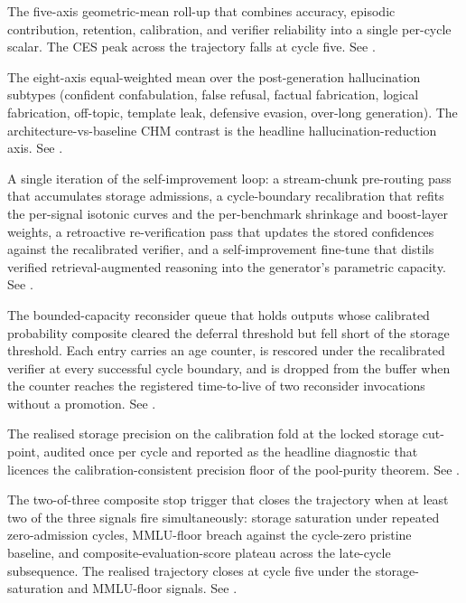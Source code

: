 \begin{description}[style=nextline, leftmargin=0pt, labelindent=0pt, itemsep=6pt, parsep=0pt, font=\bfseries, beginpenalty=10000]
\item[Composite evaluation score (CES).] The five-axis geometric-mean roll-up that combines accuracy, episodic contribution, retention, calibration, and verifier reliability into a single per-cycle scalar. The CES peak across the trajectory falls at cycle five. See .

\item[Composite hallucination metric (CHM).]\nopagebreak[4] The eight-axis equal-weighted mean over the post-generation hallucination subtypes (confident confabulation, false refusal, factual fabrication, logical fabrication, off-topic, template leak, defensive evasion, over-long generation). The architecture-vs-baseline CHM contrast is the headline hallucination-reduction axis. See .

\item[Cycle.]\nopagebreak[4] A single iteration of the self-improvement loop: a stream-chunk pre-routing pass that accumulates storage admissions, a cycle-boundary recalibration that refits the per-signal isotonic curves and the per-benchmark shrinkage and boost-layer weights, a retroactive re-verification pass that updates the stored confidences against the recalibrated verifier, and a self-improvement fine-tune that distils verified retrieval-augmented reasoning into the generator's parametric capacity. See .

\item[Deferred buffer.] The bounded-capacity reconsider queue that holds outputs whose calibrated probability composite cleared the deferral threshold but fell short of the storage threshold. Each entry carries an age counter, is rescored under the recalibrated verifier at every successful cycle boundary, and is dropped from the buffer when the counter reaches the registered time-to-live of two reconsider invocations without a promotion. See .

\item[Empirical-precision anchor.] The realised storage precision on the calibration fold at the locked storage cut-point, audited once per cycle and reported as the headline diagnostic that licences the calibration-consistent precision floor of the pool-purity theorem. See .

\item[Equilibrium-saturation gate.]\nopagebreak[4] The two-of-three composite stop trigger that closes the trajectory when at least two of the three signals fire simultaneously: storage saturation under repeated zero-admission cycles, MMLU-floor breach against the cycle-zero pristine baseline, and composite-evaluation-score plateau across the late-cycle subsequence. The realised trajectory closes at cycle five under the storage-saturation and MMLU-floor signals. See .


\end{description}
